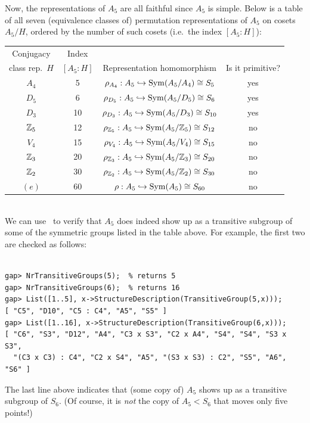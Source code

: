 Now, the representations of $A_5$ are all faithful since $A_5$ is simple.  Below is
a table of all seven (equivalence classes of) permutation representations of
$A_5$ on cosets $A_5/H$, ordered by the number of such cosets (i.e.~the index
$[A_5:H]$): \\
{\small
  \begin{center}
\begin{tabular}{c|c|c|c}
  Conjugacy & Index & &  \\
   class rep.~$H$   & $[A_5: H]$ & Representation homomorphism & Is it primitive?\\
\hline
$A_4$ &  5 & $\rho_{A_4}  : A_5 \hookrightarrow \operatorname{Sym}(A_5/A_4) \cong S_5$ & yes \\
$D_5$ &  6 & $\rho_{D_5}  : A_5 \hookrightarrow \operatorname{Sym}(A_5/D_5) \cong S_6$ & yes \\
$D_3$ & 10 & $\rho_{D_3}  : A_5 \hookrightarrow \operatorname{Sym}(A_5/D_3) \cong S_{10}$ & yes \\
$\mathbb{Z}_5$& 12 & $\rho_{\mathbb{Z}_5} : A_5 \hookrightarrow \operatorname{Sym}(A_5/\mathbb{Z}_5) \cong S_{12}$ & no\\
$V_4$ & 15 & $\rho_{V_4}  : A_5 \hookrightarrow \operatorname{Sym}(A_5/V_4) \cong S_{15}$ & no\\
$\mathbb{Z}_3$& 20 & $\rho_{\mathbb{Z}_3} : A_5 \hookrightarrow \operatorname{Sym}(A_5/\mathbb{Z}_3) \cong S_{20}$ & no\\
$\mathbb{Z}_2$& 30 & $\rho_{\mathbb{Z}_2} : A_5 \hookrightarrow \operatorname{Sym}(A_5/\mathbb{Z}_2) \cong S_{30}$ & no\\
$(e)$& 60 & $\rho : A_5 \hookrightarrow \operatorname{Sym}(A_5) \cong S_{60}$ & no\\
\hline
\end{tabular}
  \end{center}
  }
~\\[4pt]
We can use \gap\ to verify that $A_5$ does indeed show up as a transitive
subgroup of some of the symmetric groups listed in the table above.  For
example, the first two are checked as follows:
{\codesize 
\begin{verbatim}

gap> NrTransitiveGroups(5);  % returns 5
gap> NrTransitiveGroups(6);  % returns 16
gap> List([1..5], x->StructureDescription(TransitiveGroup(5,x)));
[ "C5", "D10", "C5 : C4", "A5", "S5" ]
gap> List([1..16], x->StructureDescription(TransitiveGroup(6,x)));
[ "C6", "S3", "D12", "A4", "C3 x S3", "C2 x A4", "S4", "S4", "S3 x S3", 
  "(C3 x C3) : C4", "C2 x S4", "A5", "(S3 x S3) : C2", "S5", "A6", "S6" ]

\end{verbatim}}
\noindent The last line above indicates that (some copy of) $A_5$ shows up as a transitive
subgroup of $S_6$.  (Of course, it is \emph{not} the copy of $A_5< S_6$ that
moves only five points!) 

